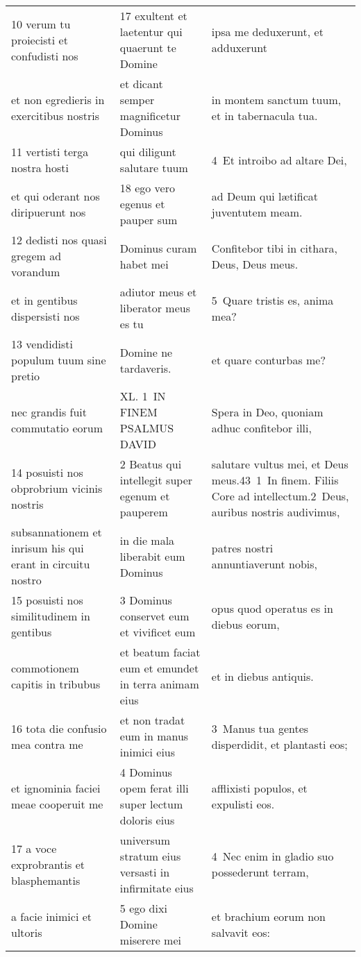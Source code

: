 \documentclass{article}
\begin{document}
\begin{longtable}{@{}p{}p{}p{}@{}}
10 verum tu proiecisti et confudisti nos	&	17 exultent et laetentur qui quaerunt te Domine	&	ipsa me deduxerunt, et adduxerunt	\\
et non egredieris in exercitibus nostris	&	et dicant semper magnificetur Dominus	&	in montem sanctum tuum, et in tabernacula tua.	\\
11 vertisti terga nostra hosti	&	qui diligunt salutare tuum	&	4 Et introibo ad altare Dei,	\\
et qui oderant nos diripuerunt nos	&	18 ego vero egenus et pauper sum	&	ad Deum qui lætificat juventutem meam.	\\
12 dedisti nos quasi gregem ad vorandum	&	Dominus curam habet mei	&	Confitebor tibi in cithara, Deus, Deus meus.	\\
et in gentibus dispersisti nos	&	adiutor meus et liberator meus es tu	&	5 Quare tristis es, anima mea?	\\
13 vendidisti populum tuum sine pretio	&	Domine ne tardaveris.	&	et quare conturbas me?	\\
nec grandis fuit commutatio eorum	&	XL. 1 IN FINEM PSALMUS DAVID	&	Spera in Deo, quoniam adhuc confitebor illi,	\\
14 posuisti nos obprobrium vicinis nostris	&	2 Beatus qui intellegit super egenum et pauperem	&	salutare vultus mei, et Deus meus.43 1 In finem. Filiis Core ad intellectum.2 Deus, auribus nostris audivimus,	\\
subsannationem et inrisum his qui erant in circuitu nostro	&	in die mala liberabit eum Dominus	&	patres nostri annuntiaverunt nobis,	\\
15 posuisti nos similitudinem in gentibus	&	3 Dominus conservet eum et vivificet eum	&	opus quod operatus es in diebus eorum,	\\
commotionem capitis in tribubus	&	et beatum faciat eum et emundet in terra animam eius	&	et in diebus antiquis.	\\
16 tota die confusio mea contra me	&	et non tradat eum in manus inimici eius	&	3 Manus tua gentes disperdidit, et plantasti eos;	\\
et ignominia faciei meae cooperuit me	&	4 Dominus opem ferat illi super lectum doloris eius	&	afflixisti populos, et expulisti eos.	\\
17 a voce exprobrantis et blasphemantis	&	universum stratum eius versasti in infirmitate eius	&	4 Nec enim in gladio suo possederunt terram,	\\
a facie inimici et ultoris	&	5 ego dixi Domine miserere mei	&	et brachium eorum non salvavit eos:	\\

\end{longtable}
\end{document}
